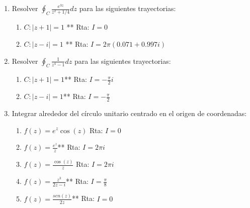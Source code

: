 \documentclass[10pt,a4paper]{article}
\begin{document}
\begin{enumerate}
\item {Resolver $\oint_{C}\frac{e^{3z}}{z^2+1/4}dz$ para las siguientes 
trayectorias:}	
\begin{enumerate}
	\item $C:|z+1|=1$ ** \tab Rta: $I=0$
	\item $C:|z-i|=1$ ** \tab Rta: $I=2\pi(0.071+0.997i)$
\end{enumerate}
\item {Resolver $\oint_{C}\frac{1}{z^4-1}dz$ para las siguientes 
	trayectorias:}	
\begin{enumerate}
	\item $C:|z+1|=1$** \tab Rta: $I=-\frac{\pi}{2}i$
	\item $C:|z-i|=1$** \tab Rta: $I=-\frac{\pi}{2}$
\end{enumerate}

\item {Integrar alrededor del c\'irculo unitario centrado en el origen de 
coordenadas:}	
\begin{enumerate}
	\item $f(z)=e^z\cos{(z)}$ \tab Rta: $I=0$
	\item $f(z)=\frac{e^z}{z}$** \tab Rta: $I=2\pi i$
	\item $f(z)=\frac{\cos{(z)}}{z}$ \tab Rta: $I=2\pi i$
	\item $f(z)=\frac{z^3}{2z-i}$** \tab Rta: $I=\frac{\pi}{8}$
	\item $f(z)=\frac{sen(z)}{2z}$** \tab Rta: $I=0$
\end{enumerate}



\end{enumerate}
\end{document}

